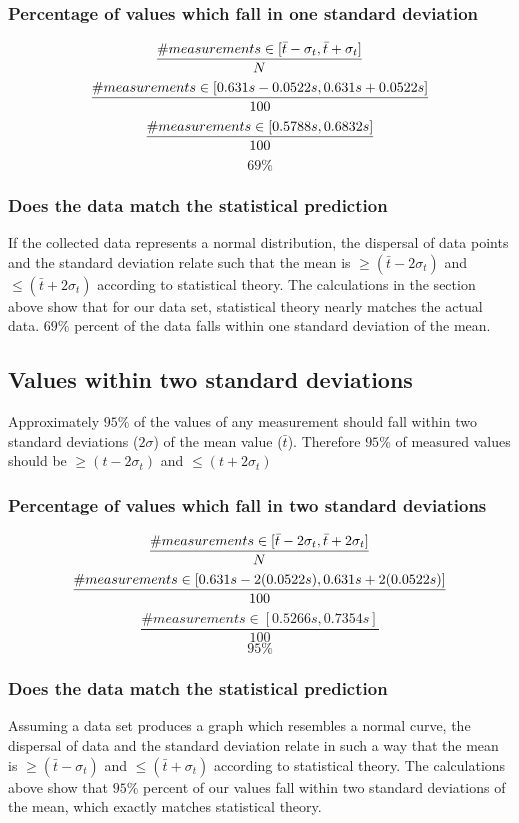 \documentclass[11pt, letterpaper, includehead]{article}
\begin{document}
\subsubsection{Percentage of values which fall in one standard deviation} %
$$\frac{\# measurements \in [\bar{t} - \sigma_t, \bar{t} + \sigma_t]}{N} \\$$
$$\frac{\# measurements \in [0.631s - 0.0522s, 0.631s + 0.0522s]}{100} \\$$
$$\frac{\# measurements \in [0.5788s, 0.6832s]}{100} \\$$
$$\boxed{69\%}$$

\subsubsection{Does the data match the statistical prediction} %
If the collected data represents a normal distribution,
the dispersal of data points and the standard deviation relate such that the mean is
$\geq (\bar{t} - 2\sigma_t)$ and $\leq (\bar{t} + 2\sigma_t)$ according
to statistical theory. The calculations in the section above show that
for our data set, statistical theory nearly matches the actual data.
$69\%$ percent of the data falls within one standard deviation of the mean.

\subsection{Values within two standard deviations} %
Approximately $95\%$ of the values of any measurement should fall within two
standard deviations ($2 \sigma$) of the mean value ($\bar{t}$). Therefore $95\%$ of measured
values should be $\geq (t - 2 \sigma_t)$ and $\leq (t + 2 \sigma_t)$

\subsubsection{Percentage of values which fall in two standard deviations} %
$$\frac{\# measurements \in [\bar{t} - 2\sigma_t, \bar{t} + 2\sigma_t]}{N} \\$$
$$\frac{\# measurements \in [0.631s - 2(0.0522s), 0.631s + 2(0.0522s)]}{100} \\$$
$$\frac{\# measurements \in [0.5266s, 0.7354s]}{100}$$
$$\boxed{95\%}$$

\subsubsection{Does the data match the statistical prediction} %
Assuming a data set produces a graph which resembles a normal
curve, the dispersal of data and the standard deviation
relate in such a way that the mean is $\geq (\bar{t} - \sigma_t)$ and $\leq (\bar{t} + \sigma_t)$
according to statistical theory. The calculations above show that
$95\%$ percent of our values fall within two standard deviations of the mean,
which exactly matches statistical theory.
\end{document}

